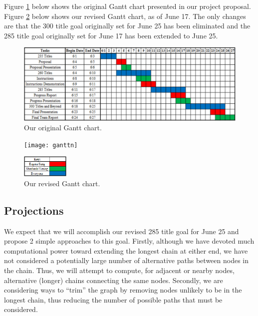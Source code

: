\documentclass[11pt,english]{article}
\begin{document}
Figure \ref{fig:gantto} below shows the original Gantt chart presented in
our project proposal. Figure \ref{fig:ganttn} below shows our revised Gantt
chart, as of June 17. The only changes are that the 300 title goal originally
set for June 25 has been eliminated and the 285 title goal originally set for
June 17 has been extended to June 25.
\begin{figure}[h]
\begin{center}
\includegraphics[width=\textwidth]{gantto}
\end{center}
\vspace{-0.7cm}
\caption{Our original Gantt chart.}
\label{fig:gantto}
\end{figure}
\begin{figure}[h]
\begin{center}
\texttt{[image: ganttn]}
\end{center}
\vspace{-0.7cm}
\caption{Our revised Gantt chart.}
\label{fig:ganttn}
\includegraphics[width=0.2\textwidth]{key}
\end{figure}

\newpage
\subsection{Projections}
We expect that we will accomplish our revised 285 title goal for June 25 and
propose 2 simple approaches to this goal.
Firstly, although we have devoted much computational power toward extending the
longest chain at either end, we have not considered a potentially large number
of alternative paths between nodes in the chain. Thus, we will attempt to
compute, for adjacent or nearby nodes, alternative (longer) chains connecting
the same nodes. Secondly, we are considering ways to ``trim'' the graph by
removing nodes unlikely to be in the longest chain, thus reducing the number of
possible paths that must be considered.
\end{document}
